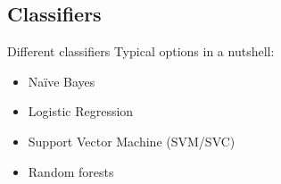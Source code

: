 \documentclass[handout]{beamer}
\begin{document}
%
%
%
%
%
%
%

\subsection{Classifiers}


\begin{frame}{Different classifiers}
Typical options in a nutshell:
\begin{itemize}
	\item Na\"ive Bayes
	\item Logistic Regression
	\item Support Vector Machine (SVM/SVC)
	\item Random forests
\end{itemize}
\end{frame}
\end{document}
